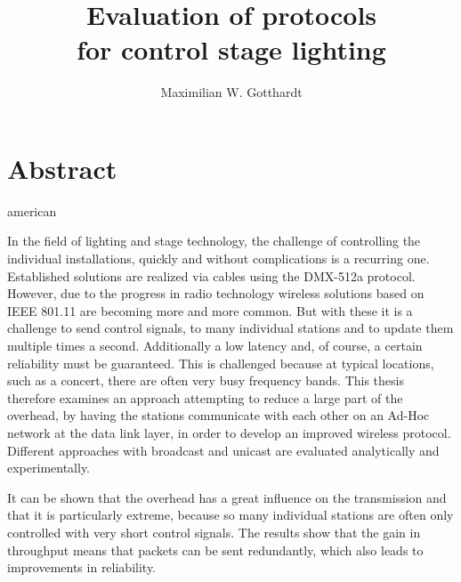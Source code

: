 \documentclass[]{ccs-thesis}
\author{Maximilian W. Gotthardt}
\title{Evaluation of protocols \\for control stage lighting}
\begin{document}

\maketitle

\thispagestyle{empty}

\cleardoublepage

\chapter*{Abstract}
\begin{otherlanguage*}{american}


In the field of lighting and stage technology, the challenge of controlling the individual installations, 
quickly and without complications is a recurring one.
Established solutions are realized via cables using the DMX-512a protocol. 
However, due to the progress in radio technology 
wireless solutions based on IEEE 801.11 are becoming more and more common. 
But with these it is a challenge to send control signals, 
to many individual stations and to update them multiple times a second.
Additionally a low latency and, of course, a certain reliability must be guaranteed.
This is challenged because at typical locations, such as a concert, there are often very busy frequency bands.
This thesis therefore examines an approach attempting to reduce a large part of the overhead,
by having the stations communicate with each other on an Ad-Hoc network at the data link layer,
in order to develop an improved wireless protocol.
Different approaches with broadcast and unicast are evaluated analytically and experimentally.

It can be shown that the overhead has a great influence on the transmission and that it is particularly extreme,
because so many individual stations are often only controlled with very short control signals.
The results show that the gain in throughput means that packets can be sent redundantly,
which also leads to improvements in reliability.

\end{otherlanguage*}
\end{document}
